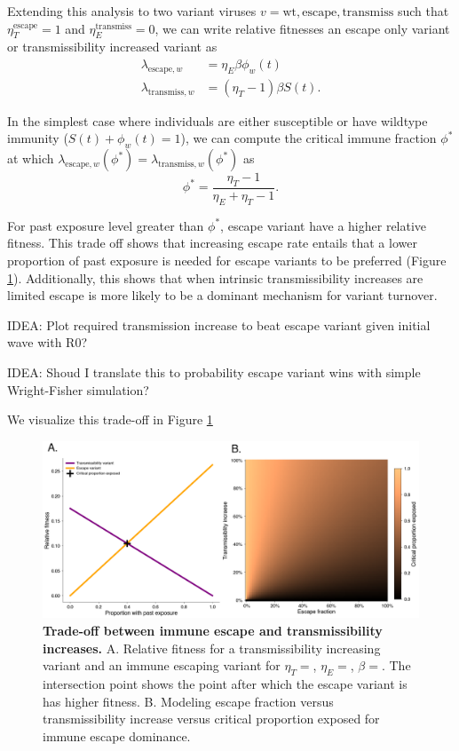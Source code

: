 \documentclass[12pt,oneside,letterpaper]{article}
\newcommand{\wt}{\text{wt}}
\newcommand{\varE}{\text{escape}}
\newcommand{\varT}{\text{transmiss}}
\begin{document}
Extending this analysis to two variant viruses $v= \wt, \varE, \varT$ such that $\eta_{T}^{\varE} = 1$ and $\eta_{E}^{\varT} = 0$, we can write relative fitnesses an escape only variant or transmissibility increased variant as
\begin{align*}
    \lambda_{\varE, w} &= \eta_{E} \beta \phi_{w}(t)\\
    \lambda_{\varT, w} &= (\eta_{T} - 1) \beta S(t).
\end{align*}

In the simplest case where individuals are either susceptible or have wildtype immunity ($S(t) + \phi_{w}(t) = 1$), we can compute the critical immune fraction $\phi^{*}$ at which $\lambda_{\varE, w}(\phi^{*}) = \lambda_{\varT, w}(\phi^{*})$ as
\begin{equation} \label{eq:critical_immunity}
    \phi^{*} = \frac{\eta_{T} - 1}{\eta_{E} + \eta_{T} - 1}.
\end{equation}

For past exposure level greater than $\phi^{*}$, escape variant have a higher relative fitness.
This trade off shows that increasing escape rate entails that a lower proportion of past exposure is needed for escape variants to be preferred (Figure \ref{fig:transmission_tradeoff}). 
Additionally, this shows that when intrinsic transmissibility increases are limited escape is more likely to be a dominant mechanism for variant turnover.

IDEA: Plot required transmission increase to beat escape variant given initial wave with R0?

IDEA: Shoud I translate this to probability escape variant wins with simple Wright-Fisher simulation?


We visualize this trade-off in Figure \ref{fig:transmission_tradeoff}

\begin{figure}[h]
    \centering
    \includegraphics[width=0.8\linewidth]{./figures/transmission_tradeoff.png}
    \caption{\textbf{Trade-off between immune escape and transmissibility increases.} 
    A. Relative fitness for a transmissibility increasing variant and an immune escaping variant for $\eta_{T}=$, $\eta_{E}=$, $\beta=$. 
    The intersection point shows the point after which the escape variant is has higher fitness. 
    B. Modeling escape fraction versus transmissibility increase versus critical proportion exposed for immune escape dominance.}%
    \label{fig:transmission_tradeoff}
\end{figure}
\end{document}
